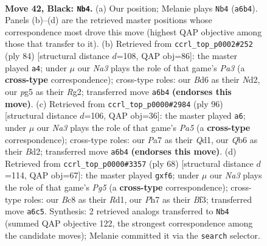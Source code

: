 \documentclass[11pt]{article}
\begin{document}
\clearpage

\begin{figure}[p]\centering
\begin{subfigure}{0.46\textwidth}\centering
\resizebox{\linewidth}{!}{%
\newchessgame
\chessboard[
  setfen={2b4r/p2r1k1p/nq1b2pP/1p1p1pP1/3P1P1K/1P2P3/4N3/R2Q1BNR b - - 31 42},
  showmover=false,
  pgfstyle=straightmove, color=movearrow, markmove={a6-b4}
]}
\caption{}
\end{subfigure}\hfill
\begin{subfigure}{0.46\textwidth}\centering
\resizebox{\linewidth}{!}{%
\newchessgame
\chessboard[
  setfen={2n2r2/3bq2r/kp2p2p/pn1p3P/2pP2P1/P1P1Q1BB/2PN2R1/R6K w - - 7 43},
  showmover=false,
  pgfstyle=straightmove, color=movearrow, markmove={a3-a4}
]}
\caption{}
\end{subfigure}
\\[4pt]
\begin{subfigure}{0.46\textwidth}\centering
\resizebox{\linewidth}{!}{%
\newchessgame
\chessboard[
  setfen={r2b1qk1/6rn/1p1p2n1/P1pPp3/R1P1PpP1/1R5N/K2BB2P/3Q4 w - - 0 49},
  showmover=false,
  pgfstyle=straightmove, color=movearrow, markmove={a5-a6}
]}
\caption{}
\end{subfigure}\hfill
\begin{subfigure}{0.46\textwidth}\centering
\resizebox{\linewidth}{!}{%
\newchessgame
\chessboard[
  setfen={2r1r1k1/3nq2p/1p1p2p1/p1nP1pP1/P1PN3Q/1P3B2/7P/3R1R1K w - f6 0 35},
  showmover=false,
  pgfstyle=straightmove, color=movearrow, markmove={g5-f6}
]}
\caption{}
\end{subfigure}
\caption{\textbf{Move 42, Black: \texttt{Nb4}.} (a) Our position; Melanie plays \texttt{Nb4} (\texttt{a6b4}). Panels (b)--(d) are the retrieved master positions whose correspondence most drove this move (highest QAP objective among those that transfer to it). (b) Retrieved from \texttt{ccrl\_top\_p0002\#252} (ply 84) [structural distance $d$=108, QAP obj=86]: the master played \texttt{a4}; under $\mu$ our \emph{Na3} plays the role of that game's \emph{Pa3} (a \textbf{cross-type} correspondence); cross-type roles: our \emph{B}d6 as their \emph{N}d2, our \emph{p}g5 as their \emph{R}g2; transferred move \texttt{a6b4} \textbf{(endorses this move)}. (c) Retrieved from \texttt{ccrl\_top\_p0000\#2984} (ply 96) [structural distance $d$=106, QAP obj=36]: the master played \texttt{a6}; under $\mu$ our \emph{Na3} plays the role of that game's \emph{Pa5} (a \textbf{cross-type} correspondence); cross-type roles: our \emph{P}a7 as their \emph{Q}d1, our \emph{Q}b6 as their \emph{B}d2; transferred move \texttt{a6b4} \textbf{(endorses this move)}. (d) Retrieved from \texttt{ccrl\_top\_p0000\#3357} (ply 68) [structural distance $d$=114, QAP obj=67]: the master played \texttt{gxf6}; under $\mu$ our \emph{Na3} plays the role of that game's \emph{Pg5} (a \textbf{cross-type} correspondence); cross-type roles: our \emph{B}c8 as their \emph{R}d1, our \emph{P}h7 as their \emph{B}f3; transferred move \texttt{a6c5}. Synthesis: 2 retrieved analogs transferred to \texttt{Nb4} (summed QAP objective 122, the strongest correspondence among the candidate moves); Melanie committed it via the \texttt{search} selector.}
\label{fig:thought-m83}
\end{figure}
\end{document}
